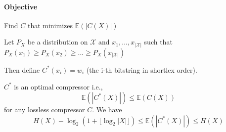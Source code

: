 \paragraph{Objective} Find $C$ that minimizes $\mathbb{E}(|C(X)|)$

\begin{thm}
Let $P_X$ be a distribution on $\mathcal{X}$ and $x_1,...,x_{|\mathcal{X}|}$ such that $P_X(x_1)\geq P_X(x_2)\geq ... \geq P_X(x_{|\mathcal{X}|})$

Then define $C^*(x_i)=w_i$ (the i-th bitstring in shortlex order).

$C^*$ is an optimal compressor i.e.,
\begin{equation*}
\mathbb{E}(|C^*(X)|) \leq \mathbb{E}(C(X))
\end{equation*}
for any lossless compressor $C$. We have
\begin{equation*}
H(X) - \log_2(1+ \lfloor \log_2 |X| \rfloor) \leq \mathbb{E}(|C^*(X)|) \leq H(X)
\end{equation*}
\end{thm}

